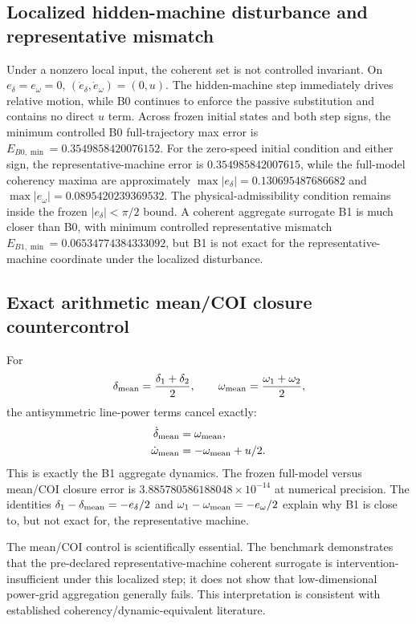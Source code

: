 \subsection{Localized hidden-machine disturbance and representative mismatch}

Under a nonzero local input, the coherent set is not controlled invariant. On $e_\delta=e_\omega=0$, $(\dot e_\delta,\dot e_\omega)=(0,u)$. The hidden-machine step immediately drives relative motion, while B0 continues to enforce the passive substitution and contains no direct $u$ term. Across frozen initial states and both step signs, the minimum controlled B0 full-trajectory max error is $E_{B0,\min}=0.3549858420076152$. For the zero-speed initial condition and either sign, the representative-machine error is $0.354985842007615$, while the full-model coherency maxima are approximately $\max|e_\delta|=0.130695487686682$ and $\max|e_\omega|=0.0895420239369532$. The physical-admissibility condition remains inside the frozen $|e_\delta|<\pi/2$ bound. A coherent aggregate surrogate B1 is much closer than B0, with minimum controlled representative mismatch $E_{B1,\min}=0.06534774384333092$, but B1 is not exact for the representative-machine coordinate under the localized disturbance.

\subsection{Exact arithmetic mean/COI closure countercontrol}

For
\begin{equation}
\delta_{\rm mean}=\frac{\delta_1+\delta_2}{2},\qquad \omega_{\rm mean}=\frac{\omega_1+\omega_2}{2},
\end{equation}
the antisymmetric line-power terms cancel exactly:
\begin{align}
\dot\delta_{\rm mean}&=\omega_{\rm mean},\\
\dot\omega_{\rm mean}&=-\omega_{\rm mean}+u/2.
\end{align}
This is exactly the B1 aggregate dynamics. The frozen full-model versus mean/COI closure error is $3.885780586188048\times10^{-14}$ at numerical precision. The identities $\delta_1-\delta_{\rm mean}=-e_\delta/2$ and $\omega_1-\omega_{\rm mean}=-e_\omega/2$ explain why B1 is close to, but not exact for, the representative machine.

The mean/COI control is scientifically essential. The benchmark demonstrates that the pre-declared representative-machine coherent surrogate is intervention-insufficient under this localized step; it does not show that low-dimensional power-grid aggregation generally fails. This interpretation is consistent with established coherency/dynamic-equivalent literature.\cite{BergGhafurian1983,Sankaranarayanan1983,Kai2022}


